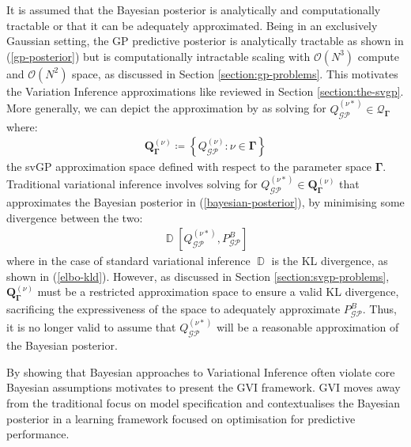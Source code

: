 \documentclass{article}
\newcommand{\D}{\operatorname{\mathbb{D}}}
\newcommand{\GP}{\operatorname{\mathcal{GP}}}
\numberwithin{equation}{section}
\begin{document}
It is assumed that the Bayesian posterior is analytically and computationally tractable or that it can be adequately approximated. Being in an exclusively Gaussian setting, the GP predictive posterior is analytically tractable as shown in (\ref{gp-posterior}) but is computationally intractable scaling with $\mathcal{O}(N^3)$ compute and $\mathcal{O}(N^2)$ space, as discussed in Section \ref{section:gp-problems}. This motivates the Variation Inference approximations like \cite{titsias2009variational} reviewed in Section \ref{section:the-svgp}. More generally, we can depict the approximation by \cite{titsias2009variational} as solving for $Q_{\GP}^{(\nu*)} \in \mathcal{Q}_{\mathbf{\Gamma}}$ where:
\begin{align}
    \boldsymbol{Q}_{\boldsymbol{\Gamma}}^{(\nu)} \coloneqq \left\{Q_{\GP}^{(\nu)}: \nu \in \mathbf{\Gamma}\right\}
    \label{svgp-space}
\end{align}
the svGP approximation space defined with respect to the parameter space $\mathbf{\Gamma}$. Traditional variational inference involves solving for $Q_{\GP}^{(\nu*)} \in \boldsymbol{Q}_{\boldsymbol{\Gamma}}^{(\nu)}$ that approximates the Bayesian posterior in (\ref{bayesian-posterior}), by minimising some divergence between the two: 
\begin{align}
\D\left[Q_{\GP}^{(\nu*)}, P_{\GP}^B\right]
\end{align}
where in the case of standard variational inference $\D$ is the KL divergence, as shown in (\ref{elbo-kld}).
However, as discussed in Section \ref{section:svgp-problems}, $\boldsymbol{Q}_{\boldsymbol{\Gamma}}^{(\nu)}$ must be a restricted approximation space to ensure a valid KL divergence, sacrificing the expressiveness of the space to adequately approximate $P_{\GP}^B$. Thus, it is no longer valid to assume that $Q_{\GP}^{(\nu*)}$ will be a reasonable approximation of the Bayesian posterior.

By showing that Bayesian approaches to Variational Inference often violate core Bayesian assumptions motivates \cite{knoblauch2022optimization} to present the GVI framework. GVI moves away from the traditional focus on model specification and contextualises the Bayesian posterior in a learning framework focused on optimisation for predictive performance.
\end{document}
